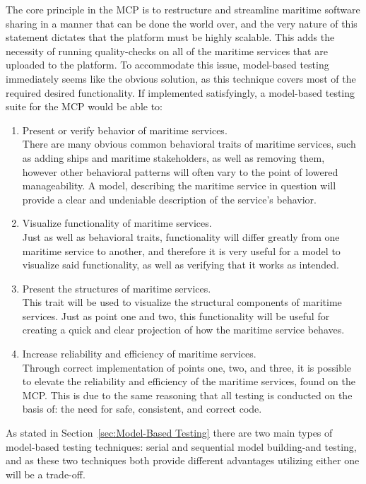 The core principle in the MCP is to restructure and streamline maritime software sharing in a manner that can be done the world over, and the very nature of this statement dictates that the platform must be highly scalable. This adds the necessity of running quality-checks on all of the maritime services that are uploaded to the platform. To accommodate this issue, model-based testing immediately seems like the obvious solution, as this technique covers most of the required desired functionality. If implemented satisfyingly, a model-based testing suite for the MCP would be able to:
\begin{enumerate}
	\item Present or verify behavior of maritime services.\\
		There are many obvious common behavioral traits of maritime services, such as adding ships and maritime stakeholders, as well as removing them, however other behavioral patterns will often vary to the point of lowered manageability. A model, describing the maritime service in question will provide a clear and undeniable description of the service's behavior.\newpage
	\item Visualize functionality of maritime services.\\
		Just as well as behavioral traits, functionality will differ greatly from one maritime service to another, and therefore it is very useful for a model to visualize said functionality, as well as verifying that it works as intended.
	\item Present the structures of maritime services.\\
		This trait will be used to visualize the structural components of maritime services. Just as point one and two, this functionality will be useful for creating a quick and clear projection of how the maritime service behaves.
	\item Increase reliability and efficiency of maritime services.\\
		Through correct implementation of points one, two, and three, it is possible to elevate the reliability and efficiency of the maritime services, found on the MCP. This is due to the same reasoning that all testing is conducted on the basis of: the need for safe, consistent, and correct code.
\end{enumerate}
\noindent
As stated in Section~\ref{sec:Model-Based Testing} there are two main types of model-based testing techniques: serial and sequential model building-and testing, and as these two techniques both provide different advantages utilizing either one will be a trade-off.\newpage

